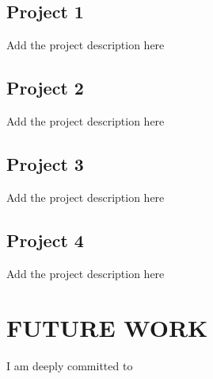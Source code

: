 \subsection{Project 1}
Add the project description here

\subsection{Project 2}
Add the project description here

\subsection{Project 3}
Add the project description here

\subsection{Project 4}
Add the project description here



\section*{FUTURE WORK}
I am deeply committed to 

\vspace*{5pt}


